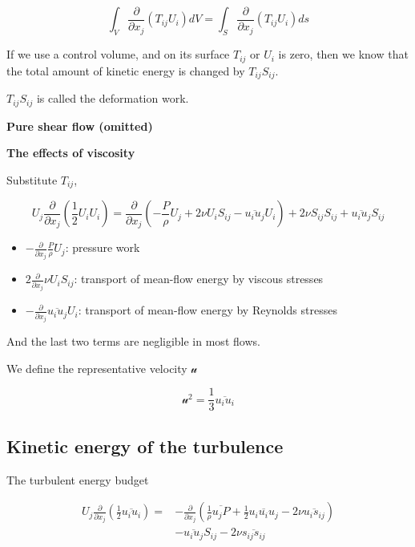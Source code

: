 \documentclass{article}
\begin{document}
\begin{equation*}
    \int_V \frac{\partial}{\partial x_j}(T_{ij}U_i) dV=\int_S \frac{\partial}{\partial x_j}(T_{ij}U_i) ds
\end{equation*}

If we use a control volume, and on its surface $T_{ij}$ or $U_i$ is zero, then we know that the total amount of kinetic energy is changed by $T_{ij}S_{ij}$.

$T_{ij}S_{ij}$ is called the deformation work.

\textbf{Pure shear flow (omitted)}

\textbf{The effects of viscosity}

Substitute $T_{ij}$,

\begin{equation*}
    U_j\frac{\partial}{\partial x_j}\left(\frac{1}{2}U_iU_i\right)=\frac{\partial}{\partial x_j}\left(-\frac{P}{\rho}U_j+2\nu U_i S_{ij}-\overline{u_iu_j}U_i\right)+2\nu S_{ij}S_{ij}+\overline{u_iu_j}S_{ij}
\end{equation*}

\begin{itemize}
    \item $-\frac{\partial}{\partial x_j}\frac{P}{\rho}U_j$: pressure work
    \item $2\frac{\partial}{\partial x_j}\nu U_i S_{ij}$: transport of mean-flow energy by viscous stresses
    \item $-\frac{\partial}{\partial x_j}\overline{u_iu_j}U_i$: transport of mean-flow energy by Reynolds stresses
\end{itemize}

And the last two terms are negligible in most flows.

We define the representative velocity $\mathcal{u}$

\begin{equation*}
    \mathcal{u}^2=\frac{1}{3}\overline{u_i u_i}
\end{equation*}

\subsection{Kinetic energy of the turbulence}

The turbulent energy budget

\begin{equation*}
    \begin{aligned}
        U_j\frac{\partial}{\partial x_j}\left(\frac{1}{2}\overline{u_iu_i}\right)=&-\frac{\partial}{\partial x_j}\left(\frac{1}{\rho}\overline{u_jP}+\frac{1}{2}\overline{u_iu_iu_j}-2\nu\overline{u_i s_{ij}}\right)\\
        &-\overline{u_iu_j}S_{ij}-2\nu\overline{s_{ij}s_{ij}}
    \end{aligned}
\end{equation*}
\end{document}
